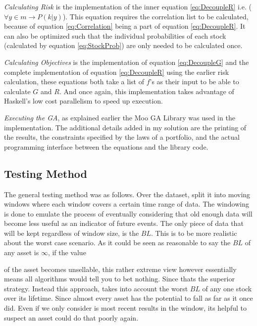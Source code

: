 \documentclass[11pt]{article}
\begin{document}
    \textit{Calculating Risk} is the implementation of the inner equation \ref{eq:DecoupleR} 
    i.e. (\(\forall y \in m \to P(k|y)\)). This equation
    requires the correlation list to be calculated, because of equation \ref{eq:Correlation} being a
    part of equation \ref{eq:DecoupleR}. It can also be optimized such that the individual
    probabilities of each stock (calculated by equation \ref{eq:StockProb}) are only needed to be
    calculated once.

    \textit{Calculating Objectives} is the implementation of equation \ref{eq:DecoupleG} and the complete
    implementation of equation \ref{eq:DecoupleR} using the earlier risk calculation, these
    equations both take a list of \(f\)'s as their input to be able to calculate \(G\) and \(R\).
    And once again, this implementation takes advantage of Haskell's low cost parallelism to speed
    up execution.

    \textit{Executing the GA}, as explained earlier the Moo GA Library \cite{Moo} was used in
    the implementation. The additional details added in my solution are the printing of the results,
    the constraints specified by the laws of a portfolio, and the actual programming interface
    between the equations and the library code.

\subsection{Testing Method}\label{section:TestingMethod}

    The general testing method was as follows. Over the dataset, split it into moving windows
    where each window covers a certain time range of data. The windowing is done to emulate
    the process of eventually considering that old enough data will become less useful
    as an indicator of future events. The only piece of data that will be kept regardless
    of window size, is the \(BL\). This is to be more realistic about the worst case scenario.
    As it could be seen as reasonable to say the \(BL\) of any asset is \(\infty\), if
    the value

    of the asset becomes unsellable, this rather extreme view however essentially means all
    algorithms would tell you to bet nothing. Since thats the superior strategy. Instead
    this approach, takes into account the worst \(BL\) of any one stock over its lifetime.
    Since almost every asset has the potential to fall as far as it once did. Even if we only
    consider is most recent results in the window, its helpful to suspect an asset could
    do that poorly again.
\end{document}

